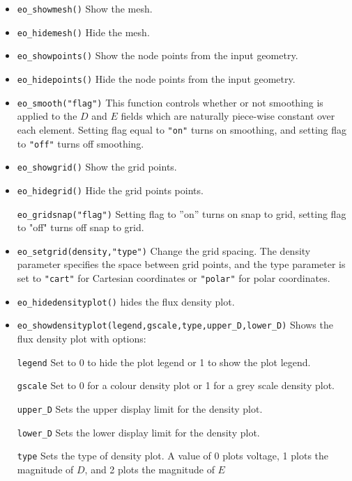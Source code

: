 \begin{itemize}
\item \texttt{eo\_showmesh()} Show the mesh.

\item \texttt{eo\_hidemesh()} Hide the mesh.

\item \texttt{eo\_showpoints()} Show the node points from the input geometry.

\item \texttt{eo\_hidepoints()} Hide the node points from the input geometry.

\item \texttt{eo\_smooth("flag")} This function controls whether or not smoothing is
applied to the $D$ and $E$ fields which are naturally piece-wise
constant over each element. Setting flag equal to \texttt{"on"}
turns on smoothing, and setting flag to \texttt{"off"} turns off
smoothing.

\item \texttt{eo\_showgrid()} Show the grid points.

\item \texttt{eo\_hidegrid()} Hide the grid points points.

\texttt{eo\_gridsnap("flag")} Setting flag to ''on'' turns on snap to grid,
setting flag to "off" turns off snap to grid.

\item \texttt{eo\_setgrid(density,"type")} Change the grid spacing. The density
parameter specifies the space between grid points, and the type
parameter is set to \texttt{"cart"} for Cartesian coordinates or
\texttt{"polar"} for polar coordinates.

\item \texttt{eo\_hidedensityplot()} hides the flux density plot.

\item \texttt{eo\_showdensityplot(legend,gscale,type,upper{\_}D,lower{\_}D)} Shows the
flux density plot with options:

\texttt{legend} Set to 0 to hide the plot legend or 1 to show the plot
legend.

\texttt{gscale} Set to 0 for a colour density plot or 1 for a grey scale
density plot.

\texttt{upper{\_}D} Sets the upper display limit for the density plot.

\texttt{lower{\_}D} Sets the lower display limit for the density plot.

\texttt{type} Sets the type of density plot. A value of 0 plots voltage, 1
plots the magnitude of $D$, and 2 plots the magnitude of $E$


\end{itemize}
